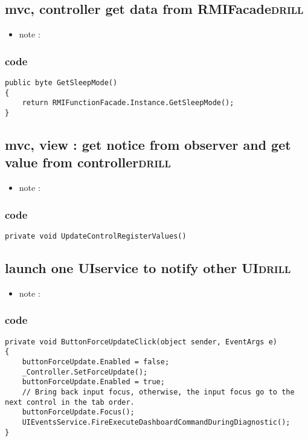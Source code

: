 \documentclass[11pt]{article}
\begin{document}
\subsection{mvc, controller get data from RMIFacade\hfill{}\textsc{drill}}
\label{sec:org25e887a}
\begin{itemize}
\item note :
\end{itemize}
\subsubsection{code}
\label{sec:orgd36f386}
\begin{verbatim}
public byte GetSleepMode()
{
    return RMIFunctionFacade.Instance.GetSleepMode();
}

\end{verbatim}

\subsection{mvc, view : get notice from observer and get value from controller\hfill{}\textsc{drill}}
\label{sec:orgb30bc20}
\begin{itemize}
\item note :
\end{itemize}
\subsubsection{code}
\label{sec:orgc67818f}
\begin{verbatim}
private void UpdateControlRegisterValues()
\end{verbatim}

\subsection{launch one UIservice to notify other UI\hfill{}\textsc{drill}}
\label{sec:org3901b46}
\begin{itemize}
\item note :
\end{itemize}
\subsubsection{code}
\label{sec:org2e325b9}
\begin{verbatim}
private void ButtonForceUpdateClick(object sender, EventArgs e)
{
    buttonForceUpdate.Enabled = false;
    _Controller.SetForceUpdate();
    buttonForceUpdate.Enabled = true;
    // Bring back input focus, otherwise, the input focus go to the next control in the tab order.
    buttonForceUpdate.Focus();
    UIEventsService.FireExecuteDashboardCommandDuringDiagnostic();
}

\end{verbatim}
\end{document}
